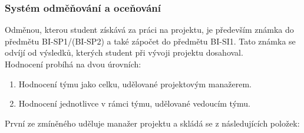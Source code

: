 \subsubsection{Systém odměňování a oceňování} \label{ppl:ranking}
Odměnou, kterou student získává za práci na projektu, je především známka do předmětu BI-SP1/(BI-SP2) a také zápočet do předmětu BI-SI1. Tato známka se odvíjí od výsledků, kterých student při vývoji projektu dosahoval.\\
Hodnocení probíhá na dvou úrovních:
\begin{enumerate}
	\item Hodnocení týmu jako celku, udělované projektovým manažerem.
	\item Hodnocení jednotlivce v rámci týmu, udělované vedoucím týmu.
\end{enumerate}
První ze zmíněného uděluje manažer projektu a skládá se z následujících položek:
